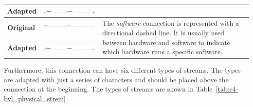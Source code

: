 \begin{longtable}{|m{}|m{}|m{}|}
    \centering
    \small \textbf{Adapted} \rule{0pt}{1.43cm} &
    \centering
    \includegraphics[width=1\linewidth]{chapters/4-MDC_model_application/image/bvl-arrow-wireless.png} & 
    \\
    \hline
    \centering
    \small \textbf{Original} \rule{0pt}{1.25cm} & 
    \centering
    \includegraphics[width=1\linewidth]{chapters/4-MDC_model_application/image/bvl-arrow-software-o.png} &
    \multirow{2}{*}{\parbox[t]{\linewidth}{\vspace{-1cm}The \textit{software} connection is represented with a directional dashed line. It is usually used between hardware and software to indicate which hardware runs a specific software.}}
    \\
    \centering
    \small \textbf{Adapted} \rule{0pt}{1.25cm} &
    \centering
    \includegraphics[width=1\linewidth]{chapters/4-MDC_model_application/image/bvl-arrow-software.png} & 
    \\
    \hline
\end{longtable}

Furthermore, this connection can have six different types of streams. The types are adapted with just a series of characters and should be placed above the connection at the beginning. The types of streams are shown in Table~\ref{tab:c4-bvl_physical_strem}

